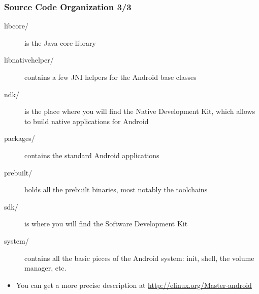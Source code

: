 \begin{frame}
  \frametitle{Source Code Organization 3/3}
  \begin{description}
  \item[libcore/] is the Java core library
  \item[libnativehelper/] contains a few JNI helpers for the Android
    base classes
  \item[ndk/] is the place where you will find the Native Development
    Kit, which allows to build native applications for Android
  \item[packages/] contains the standard Android applications
  \item[prebuilt/] holds all the prebuilt binaries, most notably the
    toolchains
  \item[sdk/] is where you will find the Software Development Kit
  \item[system/] contains all the basic pieces of the Android system:
    init, shell, the volume manager, etc.
  \end{description}
  \begin{itemize}
  \item You can get a more precise description at
    \url{http://elinux.org/Master-android}
  \end{itemize}
\end{frame}
